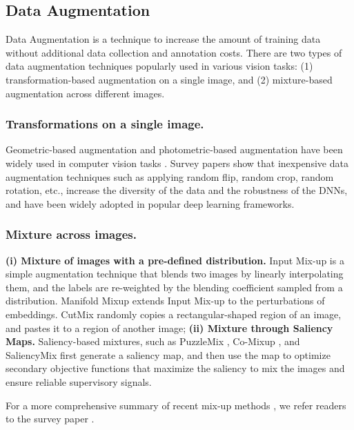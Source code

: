 \documentclass[letterpaper]{article} \usepackage[submission]{aaai23}  \usepackage{times}  \usepackage{helvet}  \usepackage{courier}  \usepackage[hyphens]{url}  \usepackage{graphicx} \urlstyle{rm} \def\UrlFont{\rm}  \usepackage{natbib}  \usepackage{caption} \frenchspacing  \setlength{\pdfpagewidth}{8.5in} \setlength{\pdfpageheight}{11in}
\newcommand{\mixup}{Input Mix-up}
\newcommand{\cutmix}{{CutMix}}
\newcommand{\puzzlemix}{{PuzzleMix}}
\newcommand{\comixup}{{Co-Mixup}}
\newcommand{\manifoldmixup}{{Manifold Mixup}}
\newcommand{\saliencymix}{{SaliencyMix}}
\begin{document}
\subsection{Data Augmentation}
Data Augmentation is a technique to increase the amount of training data without additional data collection and annotation costs. There are two types of data augmentation techniques popularly used in various vision tasks: (1) transformation-based augmentation on a single image, and (2) mixture-based augmentation across different images. 

\subsubsection{Transformations on a single image.} Geometric-based augmentation and photometric-based augmentation have been widely used in computer vision tasks \cite{devries2017improved,huang2020self,huang2020improving,huang2020comprehensive, huang2022two, wang2022toward, wang2020high}. Survey papers \cite{Halevy2009data, Sun2017data, Shorten2019DataAugSurvey} show that inexpensive data augmentation techniques such as applying random flip, random crop, random rotation, etc., increase the diversity of the data and the robustness of the DNNs, and have been widely adopted in popular deep learning frameworks.

\subsubsection{Mixture across images.} 
\textbf{(i) Mixture of images with a pre-defined distribution.} \mixup{} \cite{zhang2018mixup} is a simple augmentation technique that blends two images by linearly interpolating them, and the labels are re-weighted by the blending coefficient sampled from a distribution. \manifoldmixup{} \cite{verma2019manifold} extends \mixup{} to the perturbations of embeddings. \cutmix{} \cite{yun2019cutmix} randomly copies a rectangular-shaped region of an image, and pastes it to a region of another image; \textbf{(ii) Mixture through Saliency Maps.} Saliency-based mixtures, such as \puzzlemix{} \cite{kim2020puzzlemix}, \comixup{} \cite{kim2021comixup}, and \saliencymix{} \cite{uddin2021saliencymix} first generate a saliency map, and then use the map to optimize secondary objective functions that maximize the saliency to mix the images and ensure reliable supervisory signals.

For a more comprehensive summary of recent mix-up methods \cite{mixup1, mixup2, mixup4, mixup6, mixup9, mixup10, mixup12, mixup13}, we refer readers to the survey paper \cite{naveed2021survey}.
\end{document}
